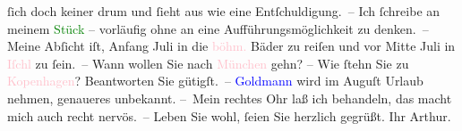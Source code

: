               ſich doch keiner drum und ſieht aus wie eine Entſchuldigung. –\pend
           \pstart
           Ich ſchreibe an meinem \textcolor{green}{Stück}{} – vorläufig ohne an eine
                  Aufführungs{\pb}möglichkeit zu denken. –\pend
           \pstart
           Meine Abſicht iſt, Anfang Juli in die \textcolor{pink}{böhm.}{}\ledrightnote{\textcolor{pink}{Böhmen}} Bäder zu reiſen und vor Mitte Juli in \textcolor{pink}{Iſchl}{}\ledrightnote{\textcolor{pink}{Bad Ischl}} zu ſein. – Wann wollen Sie nach \textcolor{pink}{München}{}\ledrightnote{\textcolor{pink}{München}} gehn? – Wie ſtehn Sie zu \textcolor{pink}{Kopenhagen}{}\ledrightnote{\textcolor{pink}{Kopenhagen}}? Beantworten Sie gütigſt. – \textcolor{blue}{Goldmann}{}\ledrightnote{\textcolor{blue}{Paul Goldmann}} wird im Auguſt Urlaub nehmen,
               genaueres unbekannt.\pend
           \pstart
           – Mein rechtes Ohr laß ich behandeln, das macht mich auch recht nervös. –\pend
           \pstart
           Leben Sie wohl, ſeien Sie herzlich gegrüßt.\pend
           \pstart Ihr \spacefill\mbox{Arthur.}\pend{}\endnumbering{}  
      